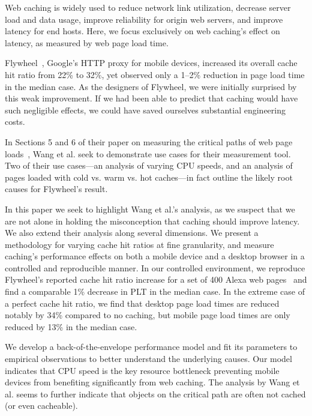 \label{intro}
Web caching is widely used to reduce network link utilization, decrease server load and data usage, improve reliability for origin web servers, and improve latency for end hosts.
Here, we focus exclusively on web caching's effect on latency, as measured by web page load time.

Flywheel~\cite{flywheel}, Google's HTTP proxy for mobile devices, increased
its overall cache hit ratio from 22\% to 32\%, yet observed only a 1--2\% reduction in page load time in the median case.
As the designers of Flywheel, we were initially surprised by this weak
improvement. If we had been able to predict that caching would have such
negligible effects, we could have saved ourselves substantial engineering costs. %

In Sections 5 and 6 of their paper on measuring the critical paths of web page 
loads~\cite{wang2013demystifying}, Wang et al. seek to demonstrate use 
cases for their measurement tool. Two of their use cases---an analysis of
varying CPU speeds, and an analysis of pages loaded with cold vs. warm vs. hot caches---in fact outline the likely root causes for Flywheel's result.

In this paper we seek to highlight Wang et al.'s analysis, as we suspect that
we are not alone in holding the misconception that caching should
improve latency. We also extend
their analysis along several dimensions.
We present 
a methodology for varying cache hit ratios at fine granularity,
and measure caching's performance effects on both a mobile device and a desktop browser in a controlled and 
reproducible manner.
In our controlled environment, we reproduce Flywheel's reported cache hit
ratio increase for
a set of
400 Alexa web pages~\cite{alexa} and find a comparable 1\% decrease in PLT in the median
case.
In the extreme case of a perfect cache hit ratio, we find that desktop page load times are reduced notably by 34\% compared to no caching, but mobile page load times are only reduced by 13\% in the median case.

We develop a back-of-the-envelope performance model and fit its parameters to
empirical observations to better understand the underlying causes.
Our model indicates that CPU speed is the key resource bottleneck preventing mobile devices from benefiting significantly from web caching. 
The analysis by Wang et al. seems to further indicate that objects on the critical path are often not cached (or even cacheable).

